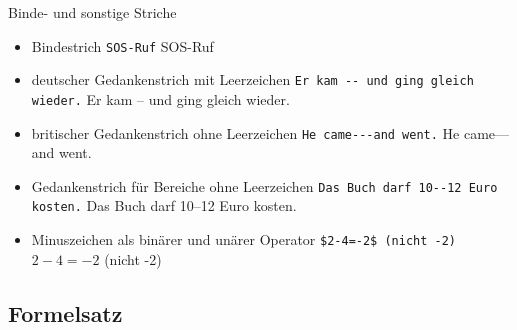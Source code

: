 \begin{Frame}[fragile]{Binde- und sonstige Striche}
  \begin{itemize}
    \item Bindestrich\newline
      \lstinline|SOS-Ruf|\newline
      SOS-Ruf
    \item deutscher Gedankenstrich mit Leerzeichen\newline
      \lstinline|Er kam -- und ging gleich wieder.|\newline
      Er kam -- und ging gleich wieder.
    \item britischer Gedankenstrich ohne Leerzeichen\newline
      \lstinline|He came---and went.|\newline
      He came---and went.
    \item Gedankenstrich für Bereiche ohne Leerzeichen\newline
      \lstinline|Das Buch darf 10--12 Euro kosten.|\newline
      Das Buch darf 10--12 Euro kosten.
    \item Minuszeichen als binärer und unärer Operator\newline
      \lstinline|$2-4=-2$ (nicht -2)|\newline
      $2-4=-2$ (nicht -2)
  \end{itemize}
\end{Frame}

\subsection{Formelsatz}

